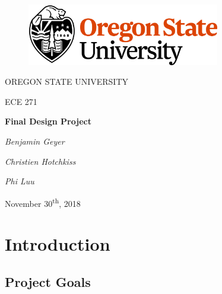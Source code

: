 \documentclass[12pt]{article}
\begin{document}
\begin{titlepage}
  \begin{center} \LARGE
    \begin{figure}[ht]
      \centering
      \includegraphics[width=0.75\textwidth]{osu_logo.png}
    \end{figure}

    \vspace{0.25in}

    OREGON STATE UNIVERSITY

    \vspace{0.25in}

    ECE 271

    \vspace{1in}

    \textbf{Final Design Project}

    \vspace{1in}

    \textit{Benjamin Geyer}

    \textit{Christien Hotchkiss}

    \textit{Phi Luu}

    \vfill

    November 30\textsuperscript{th}, 2018
  \end{center}
\end{titlepage}

\tableofcontents

\section{Introduction}

\subsection{Project Goals}

\end{document}
